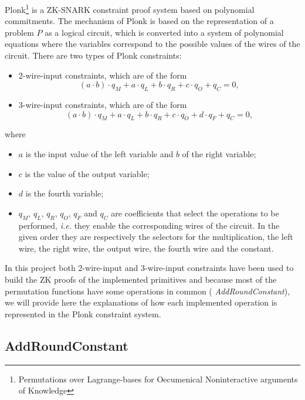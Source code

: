\documentclass[12pt, a4paper]{report}
\begin{document}
\textsf{Plonk}\footnote{Permutations over Lagrange-bases for Oecumenical Noninteractive arguments of Knowledge} is a ZK-SNARK constraint proof system based on polynomial commitments.
The mechanism of \textsf{Plonk} is based on the representation of a problem $P$ as a logical circuit, which is converted into a system of polynomial equations where the variables correspond to the possible values of the wires of the circuit.
There are two types of \textsf{Plonk} constraints:
\begin{itemize}
  \item 2-wire-input constraints, which are of the form
    \begin{equation}
      (a \cdot b) \cdot q_M + a \cdot q_L + b \cdot q_R + c \cdot q_O + q_C = 0 ,
      \label{eq:2inconstraint}
    \end{equation}
  \item 3-wire-input constraints, which are of the form
    \begin{equation}
      (a \cdot b) \cdot q_M + a \cdot q_L + b \cdot q_R + c \cdot q_O + d \cdot q_F + q_C = 0 ,
      \label{eq:3inconstraint}
    \end{equation}
\end{itemize}
where
\begin{itemize}
  \item $a$ is the input value of the left variable and $b$ of the right variable;
  \item $c$ is the value of the output variable;
  \item $d$ is the fourth variable;
  \item $q_M$, $q_L$, $q_R$, $q_O$, $q_F$ and $q_C$ are coefficients that select the operations to be performed, \textsl{i.e.} they enable the corresponding wires of the circuit. In the given order they are respectively the selectors for the multiplication, the left wire, the right wire, the output wire, the fourth wire and the constant.
\end{itemize}
In this project both 2-wire-input and 3-wire-input constraints have been used to build the ZK proofs of the implemented primitives and because most of the permutation functions have some operations in common ( \textit{AddRoundConstant}), we will provide here the explanations of how each implemented operation is represented in the \textsf{Plonk} constraint system.

\subsection{AddRoundConstant}\label{subsec:arc}
\end{document}
